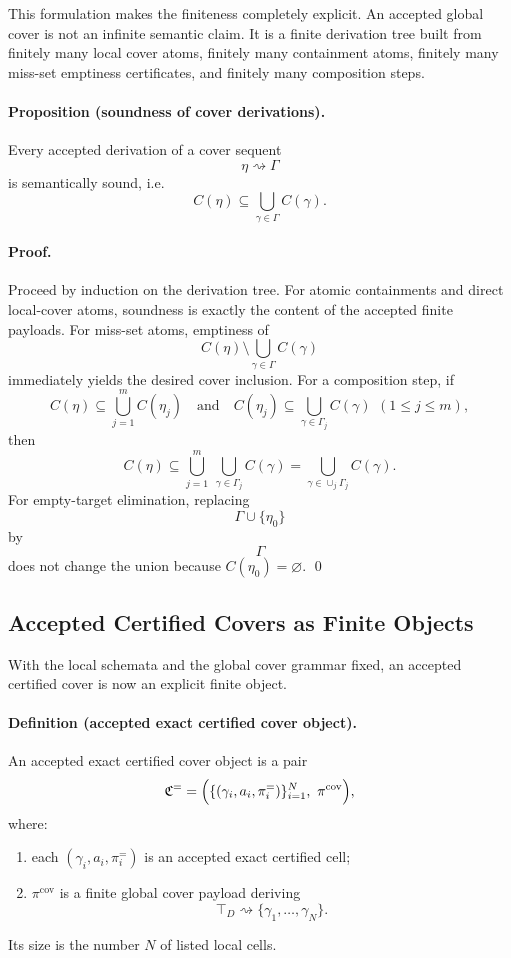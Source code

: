 This formulation makes the finiteness completely explicit. An accepted global cover is not an infinite semantic claim. It is a finite derivation tree built from finitely many local cover atoms, finitely many containment atoms, finitely many miss-set emptiness certificates, and finitely many composition steps.

\paragraph{Proposition (soundness of cover derivations).}
Every accepted derivation of a cover sequent
\[
\eta \rightsquigarrow \Gamma
\]
is semantically sound, i.e.
\[
C(\eta)
\subseteq
\bigcup_{\gamma\in\Gamma} C(\gamma).
\]

\paragraph{Proof.}
Proceed by induction on the derivation tree. For atomic containments and direct local-cover atoms, soundness is exactly the content of the accepted finite payloads. For miss-set atoms, emptiness of
\[
C(\eta)\setminus \bigcup_{\gamma\in\Gamma} C(\gamma)
\]
immediately yields the desired cover inclusion. For a composition step, if
\[
C(\eta)\subseteq \bigcup_{j=1}^m C(\eta_j)
\quad\text{and}\quad
C(\eta_j)\subseteq \bigcup_{\gamma\in\Gamma_j} C(\gamma)
\ \, (1\le j\le m),
\]
then
\[
C(\eta)
\subseteq
\bigcup_{j=1}^m\ \bigcup_{\gamma\in\Gamma_j} C(\gamma)
=
\bigcup_{\gamma\in \cup_j\Gamma_j} C(\gamma).
\]
For empty-target elimination, replacing
\[
\Gamma\cup\{\eta_0\}
\]
by
\[
\Gamma
\]
does not change the union because $C(\eta_0)=\varnothing$. \qed

\subsection{Accepted Certified Covers as Finite Objects}

With the local schemata and the global cover grammar fixed, an accepted certified cover is now an explicit finite object.

\paragraph{Definition (accepted exact certified cover object).}
An accepted exact certified cover object is a pair
\[
\mathfrak C^{=}
=
\Bigl(\{(\gamma_i,a_i,\pi_i^{=})\}_{i=1}^N,\ \pi^{\mathrm{cov}}\Bigr),
\]
where:
\begin{enumerate}
    \item each $(\gamma_i,a_i,\pi_i^{=})$ is an accepted exact certified cell;
    \item $\pi^{\mathrm{cov}}$ is a finite global cover payload deriving
    \[
    \top_D \rightsquigarrow \{\gamma_1,\dots,\gamma_N\}.
    \]
\end{enumerate}
Its size is the number $N$ of listed local cells.

